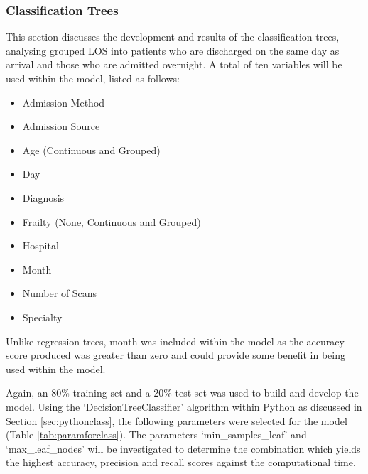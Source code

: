 \documentclass[../thesis.tex]{subfiles}
\begin{document}
\subsubsection{Classification Trees}
This section discusses the development and results of the classification trees, analysing grouped LOS into patients who are discharged on the same day as arrival and those who are admitted overnight. A total of ten variables will be used within the model, listed as follows:
\begin{multicols}{2}
    \begin{itemize}
        \item Admission Method
        \item Admission Source
        \item Age (Continuous and Grouped)
        \item Day
        \item Diagnosis
        \item Frailty (None, Continuous and Grouped)
        \item Hospital
        \item Month
        \item Number of Scans
        \item Specialty
    \end{itemize}
\end{multicols}

Unlike regression trees, month was included within the model as the accuracy score produced was greater than zero and could provide some benefit in being used within the model. 

Again, an 80\% training set and a 20\% test set was used to build and develop the model. Using the `DecisionTreeClassifier' algorithm within Python as discussed in Section \ref{sec:pythonclass}, the following parameters were selected for the model (Table \ref{tab:paramforclass}). The parameters `min\_samples\_leaf' and `max\_leaf\_nodes' will be investigated to determine the combination which yields the highest accuracy, precision and recall scores against the computational time.
\end{document}
